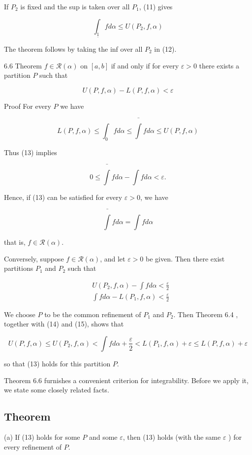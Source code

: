 \documentclass[10pt]{article}
\begin{document}
If $P_{2}$ is fixed and the sup is taken over all $P_{1}$, (11) gives

$$
\int_{\underline{1}} f d \alpha \leq U\left(P_{2}, f, \alpha\right)
$$

The theorem follows by taking the inf over all $P_{2}$ in (12).

6.6 Theorem $f \in \mathscr{R}(\alpha)$ on $[a, b]$ if and only if for every $\varepsilon>0$ there exists a partition $P$ such that

$$
U(P, f, \alpha)-L(P, f, \alpha)<\varepsilon
$$

Proof For every $P$ we have

$$
L(P, f, \alpha) \leq \int_{0} f d \alpha \leq \bar{\int} f d \alpha \leq U(P, f, \alpha)
$$

Thus (13) implies

$$
0 \leq \bar{\int} f d \alpha-\int f d \alpha<\varepsilon .
$$

Hence, if (13) can be satisfied for every $\varepsilon>0$, we have

$$
\bar{\int} f d \alpha=\int f d \alpha
$$

that is, $f \in \mathscr{R}(\alpha)$.

Conversely, suppose $f \in \mathscr{R}(\alpha)$, and let $\varepsilon>0$ be given. Then there exist partitions $P_{1}$ and $P_{2}$ such that

$$
\begin{aligned}
& U\left(P_{2}, f, \alpha\right)-\int f d \alpha<\frac{\varepsilon}{2} \\
& \int f d \alpha-L\left(P_{1}, f, \alpha\right)<\frac{\varepsilon}{2}
\end{aligned}
$$

We choose $P$ to be the common refinement of $P_{1}$ and $P_{2}$. Then Theorem 6.4 , together with (14) and (15), shows that

$$
U(P, f, \alpha) \leq U\left(P_{2}, f, \alpha\right)<\int f d \alpha+\frac{\varepsilon}{2}<L\left(P_{1}, f, \alpha\right)+\varepsilon \leq L(P, f, \alpha)+\varepsilon
$$

so that (13) holds for this partition $P$.

Theorem 6.6 furnishes a convenient criterion for integrability. Before we apply it, we state some closely related facts.

\subsection{Theorem}
(a) If (13) holds for some $P$ and some $\varepsilon$, then (13) holds (with the same $\varepsilon$ ) for every refinement of $P$.
\end{document}
